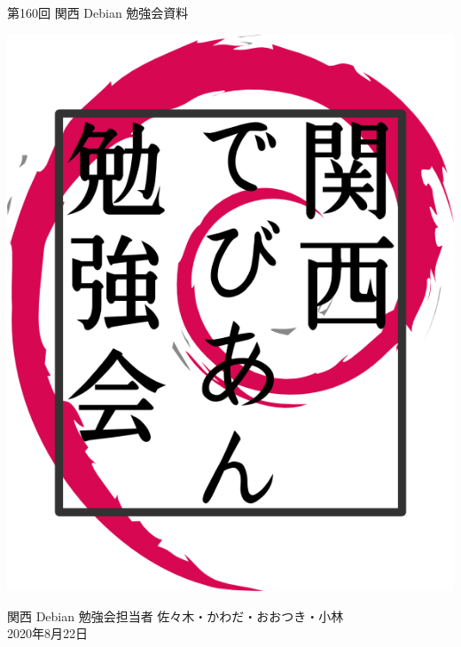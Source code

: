 \documentclass[mingoth,a4paper]{jsarticle}
\newcommand{\debmtgyear}{2020}
\newcommand{\debmtgdate}{22}
\newcommand{\debmtgmonth}{8}
\newcommand{\debmtgnumber}{160}
\begin{document}
\begin{titlepage}


 第\debmtgnumber{}回 関西 Debian 勉強会資料

\vspace{2cm}

\begin{center}
\includegraphics{image200802/kansaidebianlogo.png}
\end{center}

\begin{flushright}
\hfill{}関西 Debian 勉強会担当者 佐々木・かわだ・おおつき・小林 \\
\hfill{}\debmtgyear{}年\debmtgmonth{}月\debmtgdate{}日
\end{flushright}

\thispagestyle{empty}
\end{titlepage}

\end{document}
